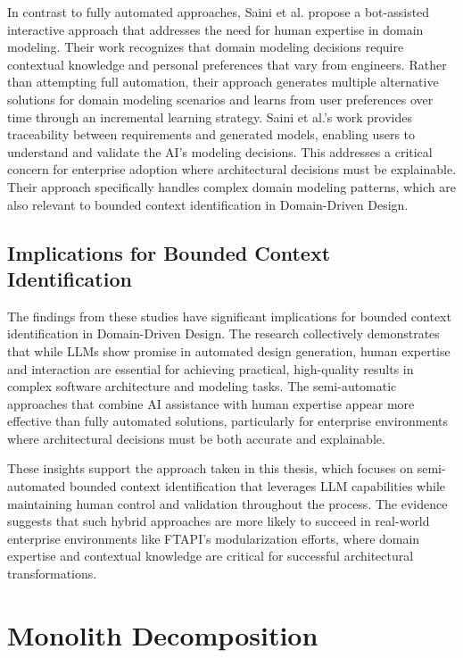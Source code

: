 In contrast to fully automated approaches, Saini et al. \autocite{Saini2022} propose a bot-assisted interactive approach that addresses the need for human expertise in domain modeling. Their work recognizes that domain modeling decisions require contextual knowledge and personal preferences that vary from engineers. Rather than attempting full automation, their approach generates multiple alternative solutions for domain modeling scenarios and learns from user preferences over time through an incremental learning strategy. Saini et al.'s work provides traceability between requirements and generated models, enabling users to understand and validate the AI's modeling decisions. This addresses a critical concern for enterprise adoption where architectural decisions must be explainable. Their approach specifically handles complex domain modeling patterns, which are also relevant to bounded context identification in Domain-Driven Design.

\subsection{Implications for Bounded Context Identification}

The findings from these studies have significant implications for bounded context identification in Domain-Driven Design. The research collectively demonstrates that while LLMs show promise in automated design generation, human expertise and interaction are essential for achieving practical, high-quality results in complex software architecture and modeling tasks. The semi-automatic approaches that combine AI assistance with human expertise appear more effective than fully automated solutions, particularly for enterprise environments where architectural decisions must be both accurate and explainable.

These insights support the approach taken in this thesis, which focuses on semi-automated bounded context identification that leverages LLM capabilities while maintaining human control and validation throughout the process. The evidence suggests that such hybrid approaches are more likely to succeed in real-world enterprise environments like FTAPI's modularization efforts, where domain expertise and contextual knowledge are critical for successful architectural transformations.

\section{Monolith Decomposition}

